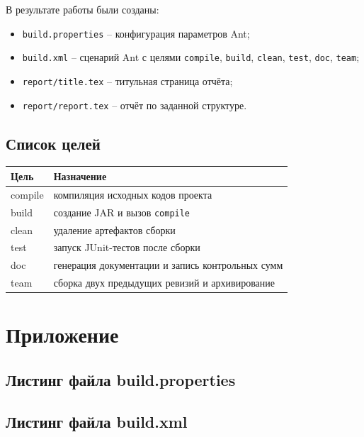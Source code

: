 \documentclass[12pt]{article}
\begin{document}
В результате работы были созданы:

\begin{itemize}[leftmargin=1.5em]
    \item \texttt{build.properties} -- конфигурация параметров Ant;
    \item \texttt{build.xml} -- сценарий Ant с целями \texttt{compile}, \texttt{build}, \texttt{clean}, \texttt{test}, \texttt{doc}, \texttt{team};
    \item \texttt{report/title.tex} -- титульная страница отчёта;
    \item \texttt{report/report.tex} -- отчёт по заданной структуре.
\end{itemize}

\subsection{Список целей}

\begin{xltabular}{\textwidth}{|L{0.25\textwidth}|Y|}
\hline
{}
\textbf{Цель} & \textbf{Назначение} \\
\hline
compile & компиляция исходных кодов проекта \\
\hline
build & создание JAR и вызов \texttt{compile} \\
\hline
clean & удаление артефактов сборки \\
\hline
test & запуск JUnit-тестов после сборки \\
\hline
doc & генерация документации и запись контрольных сумм \\
\hline
team & сборка двух предыдущих ревизий и архивирование \\
\hline
\end{xltabular}

\section{Приложение}

\subsection{Листинг файла build.properties}



\subsection{Листинг файла build.xml}
\end{document}
